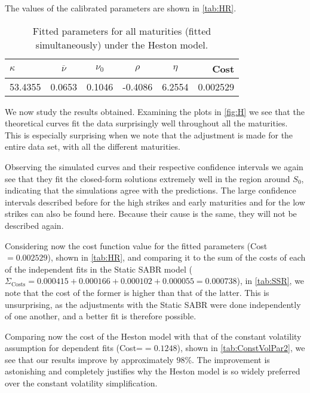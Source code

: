 The values of the calibrated parameters are shown in \autoref{tab:HR}.

\begin{table}[H]
    \centering
        \renewcommand{\arraystretch}{0.8}
\begin{tabular}{@{}lccccr@{}}
\toprule
$\kappa$ & $\overline{\nu}$ & $\nu_0$ & $\rho$ & $\eta$ & Cost \\ \midrule
53.4355 & 0.0653 & 0.1046 & -0.4086 & 6.2554 & 0.002529 \\
\bottomrule
\end{tabular}
  \caption[Fitted parameters for all maturities (fitted simultaneously) under the Heston model.]{Fitted parameters for all maturities (fitted simultaneously) under the Heston model.}
  \label{tab:HR}
\end{table}


We now study the results obtained. Examining the plots in \autoref{fig:H} we see that the theoretical curves fit the data surprisingly well throughout all the maturities.
This is especially surprising when we note that the adjustment is made for the entire data set, with all the different maturities.

Observing the simulated curves and their respective confidence intervals we again see that they fit the closed-form solutions extremely well in the region around $S_0$, indicating that the simulations agree with the predictions. The large confidence intervals described before for the high strikes and early maturities and for the low strikes can also be found here. Because their cause is the same, they will not be described again.

Considering now the cost function value for the fitted parameters (Cost$=0.002529$), shown in \autoref{tab:HR}, and comparing it to the sum of the costs of each of the independent fits in the Static SABR model ($\Sigma_{\mathrm{Costs}}=0.000415+0.000166+0.000102+0.000055=0.000738$), in \autoref{tab:SSR}, we note that the cost of the former is higher than that of the latter.
This is unsurprising, as the adjustments with the Static SABR were done independently of one another, and a better fit is therefore possible.

Comparing now the cost of the Heston model with that of the constant volatility assumption for dependent fits (Cost=$=0.1248$), shown in \autoref{tab:ConstVolPar2}, we see that our results improve by approximately $98\%$. The improvement is astonishing and completely justifies why the Heston model is so widely preferred over the constant volatility simplification.


